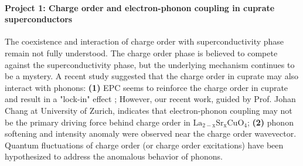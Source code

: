 \documentclass[11pt]{article}
\begin{document}
\paragraph{Project 1: Charge order and electron-phonon coupling in cuprate superconductors}
The coexistence and interaction of charge order with superconductivity phase remain not fully understood. 
The charge order phase is believed to compete against the superconductivity phase\cite{arpaia_charge_2021,comin_resonant_2016,canosa_resonant_2014, hucker_competing_2014, chang_direct_2012,ghiringhelli_long-range_2012}, but the underlying mechanism continues to be a mystery. 
A recent study suggested that the charge order in cuprate may also interact with phonons: \textbf{(1)} EPC seems to reinforce the charge order in cuprate and result in a "lock-in" effect \cite{wang_charge_2021}; However, our recent work, guided by Prof. Johan Chang at University of Zurich, indicates that electron-phonon coupling may not be the primary driving force behind charge order in $\mathrm{La_{2-x}Sr_xCuO_4}$; \textbf{(2)} phonon softening and intensity anomaly were observed near the charge order wavevector\cite{wang_charge_2021,lee_spectroscopic_2021, huang_quantum_2021,lin_strongly_2020,li_multiorbital_2020,braicovich_determining_2020,peng_enhanced_2020, miao_incommensurate_2018,chaix_dispersive_2017,tacon_inelastic_2014}. 
Quantum fluctuations of charge order (or charge order excitations) have been hypothesized to address the anomalous behavior of phonons\cite{huang_quantum_2021,lee_spectroscopic_2021}.  
\end{document}
